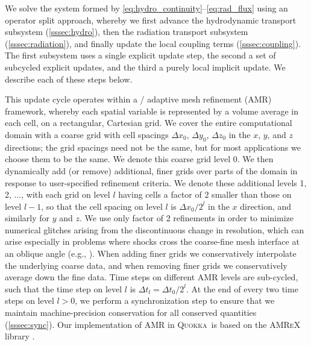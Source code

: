 \documentclass[fleqn,usenatbib]{mnras}
\newcommand{\quokka}{\textsc{Quokka}}
\begin{document}
We solve the system formed by \autoref{eq:hydro_continuity}--\autoref{eq:rad_flux} using an operator split approach, whereby we first advance the hydrodynamic transport subsystem (\autoref{sssec:hydro}), then the radiation transport subsystem (\autoref{sssec:radiation}), and finally update the local coupling terms (\autoref{sssec:coupling}). The first subsystem uses a single explicit update step, the second a set of subcycled explicit updates, and the third a purely local implicit update. We describe each of these steps below.

This update cycle operates within a \citet{Berger:1984} / \citet{Berger:1989} adaptive mesh refinement (AMR) framework, whereby each spatial variable is represented by a volume average in each cell, on a rectangular, Cartesian grid. We cover the entire computational domain with a coarse grid with cell spacings $\Delta x_0$, $\Delta y_0$, $\Delta z_0$ in the $x$, $y$, and $z$ directions; the grid spacings need not be the same, but for most applications we choose them to be the same. We denote this coarse grid level 0. We then dynamically add (or remove) additional, finer grids over parts of the domain in response to user-specified refinement criteria. We denote these additional levels 1, 2, $\ldots$, with each grid on level $l$ having cells a factor of $2$ smaller than those on level $l-1$, so that the cell spacing on level $l$ is $\Delta x_0/2^l$ in the $x$ direction, and similarly for $y$ and $z$. We use only factor of 2 refinements in order to minimize numerical glitches arising from the discontinuous change in resolution, which can arise especially in problems where shocks cross the coarse-fine mesh interface at an oblique angle (e.g., \citealt{Fryxell_2000}). When adding finer grids we conservatively interpolate the underlying coarse data, and when removing finer grids we conservatively average down the fine data. Time steps on different AMR levels are sub-cycled, such that the time step on level $l$ is $\Delta t_l = \Delta t_0/2^l$. At the end of every two time steps on level $l > 0$, we perform a synchronization step to ensure that we maintain machine-precision conservation for all conserved quantities (\autoref{sssec:sync}). Our implementation of AMR in \quokka~is based on the \textsc{AMReX} library \citep{AMReX_JOSS, the_amrex_development_team_2021_5363443}.
\end{document}
